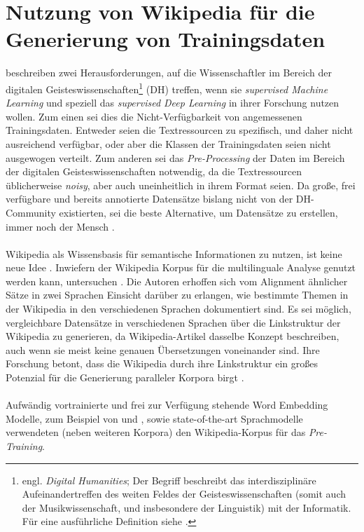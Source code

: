 \documentclass[ngerman]{ttlab-qualify}
\begin{document}
\section{Nutzung von Wikipedia für die Generierung von Trainingsdaten} \label{dl_in_dh}
\textcite{dl_in_dh} beschreiben zwei Herausforderungen, auf die Wissenschaftler im Bereich der digitalen Geisteswissenschaften\footnote{engl. \textit{Digital Humanities}; Der Begriff beschreibt das interdisziplinäre Aufeinandertreffen des weiten Feldes der Geisteswissenschaften (somit auch der Musikwissenschaft, und insbesondere der Linguistik) mit der Informatik. Für eine ausführliche Definition siehe \textcite{dig_hum}.} (DH) treffen, wenn sie \textit{supervised Machine Learning} und speziell das \textit{supervised Deep Learning} in ihrer Forschung nutzen wollen. Zum einen sei dies die Nicht-Verfügbarkeit von angemessenen Trainingsdaten. Entweder seien die Textressourcen zu spezifisch, und daher nicht ausreichend verfügbar, oder aber die Klassen der Trainingsdaten seien nicht ausgewogen verteilt. Zum anderen sei das \textit{Pre-Processing} der Daten im Bereich der digitalen Geisteswissenschaften notwendig, da die Textressourcen üblicherweise \textit{noisy}, aber auch uneinheitlich in ihrem Format seien.
Da große, frei verfügbare und bereits annotierte Datensätze bislang nicht von der DH-Community existierten, sei die beste Alternative, um Datensätze zu erstellen, immer noch der Mensch \parencite{dl_in_dh}.\\
\\
Wikipedia als Wissensbasis für semantische Informationen zu nutzen, ist keine neue Idee \parencite[s. bspw.][]{strube2006wikirelate}. Inwiefern der Wikipedia Korpus für die multilinguale Analyse genutzt werden kann, untersuchen \textcite{wiki_multilingual}. Die Autoren erhoffen sich vom Alignment ähnlicher Sätze in zwei Sprachen Einsicht darüber zu erlangen, wie bestimmte Themen in der Wikipedia in den verschiedenen Sprachen dokumentiert sind. Es sei möglich, vergleichbare Datensätze in verschiedenen Sprachen über die Linkstruktur der Wikipedia zu generieren, da Wikipedia-Artikel dasselbe Konzept beschreiben, auch wenn sie meist keine genauen Übersetzungen voneinander sind. Ihre Forschung betont, dass die Wikipedia durch ihre Linkstruktur ein großes Potenzial für die Generierung paralleler Korpora birgt \parencite{wiki_multilingual}.\\
\\
Aufwändig vortrainierte und frei zur Verfügung stehende Word Embedding Modelle, zum Beispiel von \textcite{pennington2014glove} und \textcite{mikolov2018advances}, sowie state-of-the-art Sprachmodelle \parencite{devlin-etal-2019-bert} verwendeten (neben weiteren Korpora) den Wikipedia-Korpus für das \textit{Pre-Training}.
\end{document}
